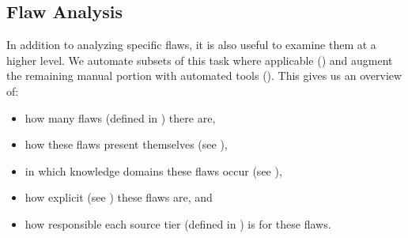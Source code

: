 \subsection{Flaw Analysis}\label{flaw-analysis}

In addition to analyzing specific flaws, it is also useful to examine them at
a higher level. We automate subsets of this task where applicable
() and augment the remaining manual portion with
automated tools (). This gives us an overview of:
\begin{itemize}
    \item how many flaws (defined in ) there are,
    \item how these flaws present themselves (see ),
    \item in which knowledge domains these flaws occur (see ),
    \item how explicit (see ) these flaws are, and
    \item how responsible each source tier (defined in ) is
          for these flaws.
\end{itemize}

